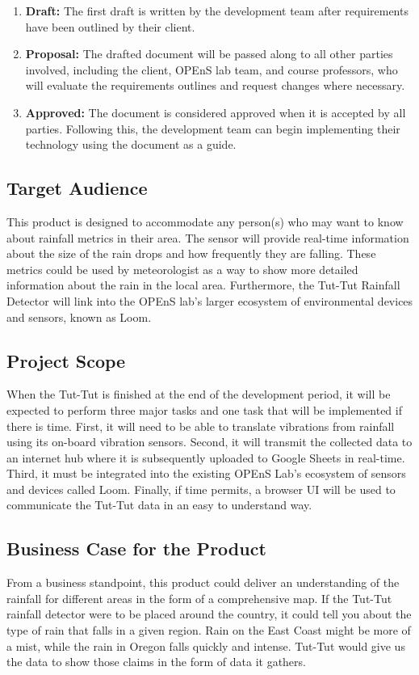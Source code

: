 \documentclass[letterpaper,10pt,draftclsnofoot,onecolumn]{article}
\begin{document}
\begin{enumerate}
    \item \textbf{Draft:}  The first draft is written by the development team after requirements have been outlined by their client. 
    \item \textbf{Proposal:} The drafted document will be passed along to all other parties involved, including the client, OPEnS lab team, and course professors, who will evaluate the requirements outlines and request changes where necessary.
    \item \textbf{Approved:} The document is considered approved when it is accepted by all parties. Following this, the development team can begin implementing their technology using the document as a guide.
\end{enumerate}

\subsection{Target Audience}
This product is designed to accommodate any person(s) who may want to know about rainfall metrics in their area. The sensor will provide real-time information about the size of the rain drops and how frequently they are falling. These metrics could be used by meteorologist as a way to show more detailed information about the rain in the local area. Furthermore, the Tut-Tut Rainfall Detector will link into the OPEnS lab's larger ecosystem of environmental devices and sensors, known as Loom.

\subsection{Project Scope}
When the Tut-Tut is finished at the end of the development period, it will be expected to perform three major tasks and one task that will be implemented if there is time. First, it will need to be able to translate vibrations from rainfall using its on-board vibration sensors. Second, it will transmit the collected data to an internet hub where it is subsequently uploaded to Google Sheets in real-time. Third, it must be integrated into the existing OPEnS Lab's ecosystem of sensors and devices called Loom. Finally, if time permits, a browser UI will be used to communicate the Tut-Tut data in an easy to understand way.

\subsection{Business Case for the Product}
From a business standpoint, this product could deliver an understanding of the rainfall for different areas in the form of a comprehensive map. If the Tut-Tut rainfall detector were to be placed around the country, it could tell you about the type of rain that falls in a given region. Rain on the East Coast might be more of a mist, while the rain in Oregon falls quickly and intense. Tut-Tut would give us the data to show those claims in the form of data it gathers.
\end{document}
